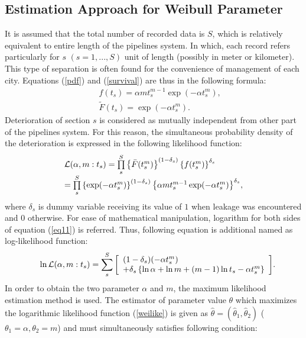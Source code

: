 \subsection{Estimation Approach for Weibull Parameter}
\label{552}
It is assumed that the total number of recorded data is $S$, which is relatively equivalent to entire length of the pipelines system. In which, each record refers particularly for $s$ $(s=1,...,S)$ unit of length (possibly in meter or kilometer). This type of separation is often found for the convenience of management of each city. Equations (\ref{pdf}) and (\ref{survival}) are thus in the following formula:
\begin{eqnarray}
&& f(t_s)=\alpha mt_s^{m-1}\exp(-\alpha t_s^m), \\
&& \tilde{F}(t_s)=\exp(-\alpha t_s^m).
\end{eqnarray}
Deterioration of section $s$ is considered as mutually independent from other part of the pipelines system. For this reason, the simultaneous probability density of the deterioration is expressed in the following likelihood function: 
\begin{eqnarray}
\begin{array}{l}
 {\cal L} (\alpha , m: t_s) = \prod\limits_s^S {\left\{ {\bar F(t_s^m )} \right\}^{(1 - \delta _s )} \left\{ {f(t_s^m )} \right\}^{\delta _s } }    \\
= \prod\limits_s^S {\left\{ {\exp ( - \alpha t_s^m )} \right\}^{(1 - \delta _s )} \left\{ {\alpha mt_s^{m - 1} \exp ( -  \alpha t_s^m )} \right\}^{\delta _s } } , \label{eq11}
 \end{array}
\end{eqnarray}
where $\delta_s$ is dummy variable receiving its value of $1$ when leakage was encountered and $0$ otherwise. For ease of mathematical manipulation, logarithm for both sides of equation (\ref{eq11}) is referred. Thus, following equation is additional named as log-likelihood function:
\begin{eqnarray}
&&\ln {\cal L} (\alpha, m: t_s )=  
\sum\limits_s^S {\left[ \begin{array}{l}
 (1 - \delta _s )( - \alpha t_s^m ) \\ 
  + \delta _s \left\{ {\ln \alpha  + \ln m + (m - 1)\ln t_s  - \alpha t_s^m } \right\} \\ 
 \end{array} \right]} .\label{weilike}
\end{eqnarray}
In order to obtain the two parameter $\alpha$ and $m$, the maximum likelihood estimation method is used. The estimator of parameter value $\theta$ which maximizes the logarithmic likelihood function (\ref{weilike}) is given as $\hat\theta =(\hat \theta _1 ,\hat\theta _2)$ ($\theta _1 =\alpha, \theta _2 =m $) and must simultaneously satisfies following condition:
